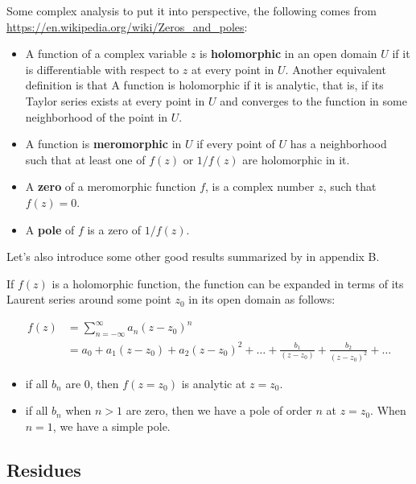 Some complex analysis to put it into perspective, the following comes from
\url{https://en.wikipedia.org/wiki/Zeros_and_poles}:
\begin{itemize}
\item A function of a complex variable $z$ is \textbf{holomorphic} in an open domain $U$ if it is
    differentiable with respect to $z$ at every point in $U$. Another equivalent definition is that A
    function is holomorphic if it is analytic, that is, if its Taylor series exists at every point in $U$
    and converges to the function in some neighborhood of the point in $U$.
\item A function is \textbf{meromorphic} in $U$ if every point of $U$ has a neighborhood such that at least
    one of $f(z)$ or $1/f(z)$ are holomorphic in it.
\item A \textbf{zero} of a meromorphic function $f$, is a complex number $z$, such that $f(z)=0$.
\item A \textbf{pole} of $f$ is a zero of $1/f(z)$.
\end{itemize}

Let's also introduce some other good results summarized by \cite{gifted-qft} in appendix B.

If $f(z)$ is a holomorphic function, the function can be expanded in terms of its Laurent series around
some point $z_0$ in its open domain as follows:

\begin{align*}
f(z) &= \sum_{n=-\infty}^{\infty} a_n \left(z - z_0\right)^n \\
&= a_0 + a_1 \left(z-z_0\right) + a_2 \left(z-z_0\right)^2 + \dots +
    \frac{b_1}{\left(z-z_0\right)} + \frac{b_2}{\left(z-z_0\right)^2} + \dots
\end{align*}

\begin{itemize}
\item if all $b_n$ are 0, then $f(z=z_0)$ is analytic at $z=z_0$.
\item if all $b_n$ when $n>1$ are zero, then we have a pole of order $n$ at $z=z_0$. When $n=1$,
    we have a simple pole.
\end{itemize}



\subsection{Residues}